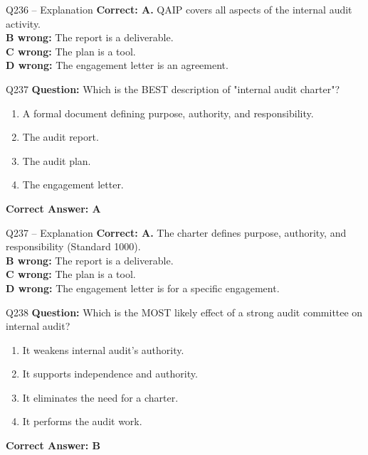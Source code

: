 \documentclass[aspectratio=169,10pt]{beamer}
\begin{document}
	\begin{frame}[t]{Q236 -- Explanation}
		\small
		\textbf{Correct: A.} QAIP covers all aspects of the internal audit activity. \\[4pt]
		\textbf{B wrong:} The report is a deliverable. \\[2pt]
		\textbf{C wrong:} The plan is a tool. \\[2pt]
		\textbf{D wrong:} The engagement letter is an agreement.
	\end{frame}
	
	\begin{frame}[t]{Q237}
		\small
		\textbf{Question:} Which is the BEST description of "internal audit charter"?
		\begin{enumerate}[label=\Alph*.,itemsep=1pt,topsep=2pt]
			\item A formal document defining purpose, authority, and responsibility.
			\item The audit report.
			\item The audit plan.
			\item The engagement letter.
		\end{enumerate}
		\vspace{4pt}
		\textbf{Correct Answer: A}
	\end{frame}
	
	\begin{frame}[t]{Q237 -- Explanation}
		\small
		\textbf{Correct: A.} The charter defines purpose, authority, and responsibility (Standard 1000). \\[4pt]
		\textbf{B wrong:} The report is a deliverable. \\[2pt]
		\textbf{C wrong:} The plan is a tool. \\[2pt]
		\textbf{D wrong:} The engagement letter is for a specific engagement.
	\end{frame}
	
	\begin{frame}[t]{Q238}
		\small
		\textbf{Question:} Which is the MOST likely effect of a strong audit committee on internal audit?
		\begin{enumerate}[label=\Alph*.,itemsep=1pt,topsep=2pt]
			\item It weakens internal audit's authority.
			\item It supports independence and authority.
			\item It eliminates the need for a charter.
			\item It performs the audit work.
		\end{enumerate}
		\vspace{4pt}
		\textbf{Correct Answer: B}
	\end{frame}
	
\end{document}
